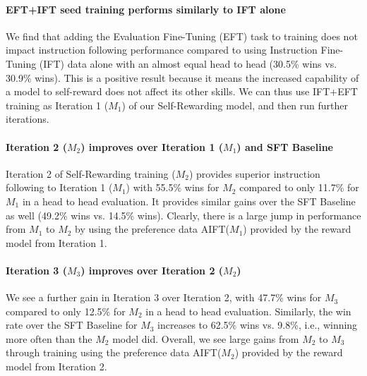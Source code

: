 \documentclass{article}
\begin{document}
\paragraph{EFT+IFT seed training performs similarly to IFT alone}
We find that adding the Evaluation Fine-Tuning (EFT) task to training does not impact instruction following performance compared to using Instruction Fine-Tuning (IFT) data alone
with an almost equal head to head (30.5\% wins vs. 30.9\% wins).
This is a positive result because it means the increased capability of a model to self-reward  does not affect its other skills. We can thus use IFT+EFT training as Iteration 1 ($M_1$) of our Self-Rewarding model, and then run further iterations.


\paragraph{Iteration 2 ($M_2$) improves over Iteration 1 ($M_1$) and SFT Baseline}
Iteration 2 of Self-Rewarding training  ($M_2$) provides superior instruction following to Iteration 1 ($M_1$)  with 55.5\% wins for $M_2$ compared to only 11.7\% for $M_1$ in a head to head evaluation. 
It provides similar gains  over the SFT Baseline as well (49.2\% wins vs. 14.5\% wins). Clearly, there is a large jump in performance from $M_1$ to $M_2$ by using the preference data AIFT($M_1$) provided by the reward model from Iteration 1.

\paragraph{Iteration 3 ($M_3$) improves over Iteration 2 ($M_2$)}
We see a further gain in Iteration 3 over Iteration 2, with 47.7\% wins for $M_3$ compared to only 12.5\% for $M_2$ in a head to head evaluation. Similarly, the win rate over the SFT Baseline for $M_3$ increases to 62.5\% wins vs. 9.8\%, i.e., winning more often than the $M_2$ model did. Overall, we see large gains from $M_2$ to $M_3$ through training using the preference data AIFT($M_2$) provided by the reward model from Iteration 2.
\end{document}
